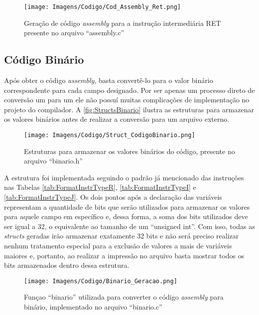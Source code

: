 \documentclass[
	12pt,				%
	oneside,
	a4paper,			%
	english,			%
	french,				%
	spanish,			%
	brazil,				%
	]{abntex2}
\begin{document}
\begin{figure}[H]
\centering 
\caption{Geração de código \emph{assembly} para a instrução intermediária RET presente no arquivo ``assembly.c''} \label{fig:AssemblyRET}
\graphicspath{ {./Imagens/} } 
\texttt{[image: Imagens/Codigo/Cod\_Assembly\_Ret.png]}
\end{figure}

\subsection{Código Binário}

Após obter o código \emph{assembly}, basta convertê-lo para o valor binário correspondente para cada campo designado. Por ser apenas um processo direto de conversão um para um ele não possuí muitas complicações de implementação no projeto do compilador. A \autoref{fig:StructsBinario} ilustra as estruturas para armazenar os valores binários antes de realizar a conversão para um arquivo externo.

\begin{figure}[htbp]
\centering 
\caption{Estruturas para armazenar os valores binários do código, presente no arquivo \nohyphens{``binario.h''}} 
\label{fig:StructsBinario}
\graphicspath{ {./Imagens/} } 
\texttt{[image: Imagens/Codigo/Struct\_CodigoBinario.png]}
\end{figure}

A estrutura foi implementada seguindo o padrão já mencionado das instruções nas Tabelas \ref{tab:FormatInstrTypeR}, \ref{tab:FormatInstrTypeI} e \ref{tab:FormatInstrTypeJ}. Os dois pontos após a declaração das variáveis representam a quantidade de bits que serão utilizados para armazenar os valores para aquele campo em específico e, dessa forma, a soma dos bits utilizados deve ser igual a 32, o equivalente ao tamanho de um ``unsigned int''. Com isso, todas as \emph{structs} geradas irão armazenar exatamente 32 bits e não será preciso realizar nenhum tratamento especial para a exclusão de valores a mais de variáveis maiores e, portanto, ao realizar a impressão no arquivo basta mostrar todos os bits armazenados dentro dessa estrutura.

\begin{figure}[htbp]
\centering 
\caption{Funçao ``binario'' utilizada para converter o código \emph{assembly} para binário, implementado no arquivo \nohyphens{``binario.c''}} 
\label{fig:GeracaoBinario}
\graphicspath{ {./Imagens/} } 
\texttt{[image: Imagens/Codigo/Binario\_Geracao.png]}
\end{figure}
\end{document}

